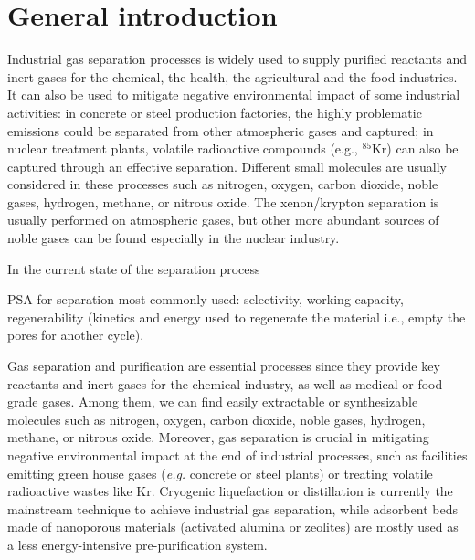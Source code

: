
\chapter*{General introduction}


Industrial gas separation processes is widely used to supply purified reactants and inert gases for the chemical, the health, the agricultural and the food industries. It can also be used to mitigate negative environmental impact of some industrial activities: in concrete or steel production factories, the highly problematic  emissions could be separated from other atmospheric gases and captured; in nuclear treatment plants, volatile radioactive compounds (e.g., $^{85}$Kr) can also be captured through an effective separation. Different small molecules are usually considered in these processes such as nitrogen, oxygen, carbon
dioxide, noble gases, hydrogen, methane, or nitrous oxide. The xenon/krypton separation is usually performed on atmospheric gases,\autocite{kerry2007industrial} but other more abundant sources of noble gases can be found especially in the nuclear industry.\autocite{Banerjee_2014} 


In the current state of the separation process



PSA for separation most commonly used: selectivity, working capacity, regenerability (kinetics and energy used to regenerate the material i.e., empty the pores for another cycle).\autocite{Kumar_1994}





Gas separation and purification are essential processes since they provide key reactants and inert gases for the chemical industry, as well as medical or food grade gases. Among them, we can find easily extractable or synthesizable molecules such as nitrogen, oxygen, carbon dioxide, noble gases, hydrogen, methane, or nitrous oxide. Moreover, gas separation is crucial in mitigating negative environmental impact at the end of industrial processes, such as facilities emitting green house gases (\emph{e.g.} concrete or steel plants) or treating volatile radioactive wastes like Kr. Cryogenic liquefaction or distillation is currently the mainstream technique to achieve industrial gas separation, while adsorbent beds made of nanoporous materials (activated alumina or zeolites) are mostly used as a less energy-intensive pre-purification system.\autocite{kerry2007industrial}

